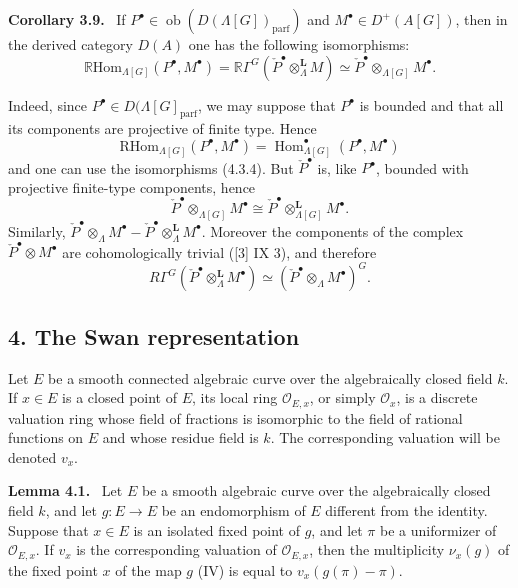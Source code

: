 \documentclass[11pt]{article}
\newenvironment{statement}[1]{\par\medskip\noindent\textbf{#1.}\ }{\par\medskip}
\DeclareMathOperator{\Hom}{Hom}
\providecommand{\RHom}{\mathrm{RHom}}
\providecommand{\parf}{\mathrm{parf}}
\providecommand{\Ob}{\operatorname{ob}}
\providecommand{\RHom}{\mathrm{RHom}}
\providecommand{\Hom}{\operatorname{Hom}}
\providecommand{\RHom}{\mathrm R\mathcal{H}om}
\providecommand{\Ob}{\operatorname{ob}}
\providecommand{\Ob}{\operatorname{Ob}}
\providecommand{\parf}{\mathrm{parf}}
\providecommand{\RHom}{\mathrm{RHom}}
\providecommand{\Hom}{\operatorname{Hom}}
\providecommand{\Ob}{\operatorname{ob}}
\providecommand{\Ob}{\operatorname{Ob}}
\begin{document}
\begin{statement}{Corollary 3.9}
If $P^\bullet\in\Ob(D(\Lambda[G])_{\parf})$ and $M^\bullet\in D^+(A[G])$, then in the derived category $D(A)$ one has the following isomorphisms:
\[
\mathbb{R}\mathrm{Hom}_{\Lambda[G]}(P^\bullet,M^\bullet)
=\mathbb{R}\Gamma^G(\check P^\bullet\otimes_\Lambda^{\mathbf L}M)
\simeq \check P^\bullet\otimes_{\Lambda[G]}M^\bullet.
\tag{3.9.1}
\]
\end{statement}

Indeed, since $P^\bullet\in D(\Lambda[G]_{\parf}$, we may suppose that $P^\bullet$ is bounded and that all its components are projective of finite type. Hence
\[
\RHom_{\Lambda[G]}(P^\bullet,M^\bullet)=\Hom_{\Lambda[G]}^\bullet(P^\bullet,M^\bullet)
\]
and one can use the isomorphisms (4.3.4). But $\check P^\bullet$ is, like $P^\bullet$, bounded with projective finite-type components, hence
\[
\check P^\bullet\otimes_{\Lambda[G]}M^\bullet\cong
\check P^\bullet\otimes_{\Lambda[G]}^{\mathbf L}M^\bullet.
\]
Similarly, $\check P^\bullet\otimes_\Lambda M^\bullet-\check P^\bullet\otimes_\Lambda^{\mathbf L}M^\bullet$. Moreover the components of the complex $\check P^\bullet\otimes M^\bullet$ are cohomologically trivial ([3] IX 3), and therefore
\[
R\Gamma^G(\check P^\bullet\otimes_\Lambda^{\mathbf L}M^\bullet)
\simeq (\check P^\bullet\otimes_\Lambda M^\bullet)^G.
\]

\subsection*{4. The Swan representation}

Let $E$ be a smooth connected algebraic curve over the algebraically closed field $k$. If $x\in E$ is a closed point of $E$, its local ring $\mathcal O_{E,x}$, or simply $\mathcal O_x$, is a discrete valuation ring whose field of fractions is isomorphic to the field of rational functions on $E$ and whose residue field is $k$. The corresponding valuation will be denoted $v_x$.

\begin{statement}{Lemma 4.1}
Let $E$ be a smooth algebraic curve over the algebraically closed field $k$, and let $g:E\to E$ be an endomorphism of $E$ different from the identity. Suppose that $x\in E$ is an isolated fixed point of $g$, and let $\pi$ be a uniformizer of $\mathcal O_{E,x}$. If $v_x$ is the corresponding valuation of $\mathcal O_{E,x}$, then the multiplicity $\nu_x(g)$ of the fixed point $x$ of the map $g$ (IV) is equal to $v_x(g(\pi)-\pi)$.
\end{statement}
\end{document}
